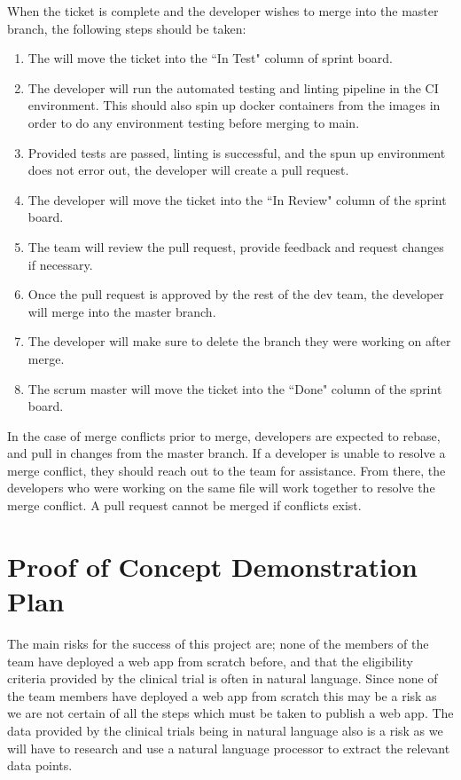 \documentclass{article}
\begin{document}
When the ticket is complete and the developer wishes to merge into the master branch, the following steps should be taken:
\begin{enumerate}
	\item The will move the ticket into the ``In Test" column of sprint board.
	\item The developer will run the automated testing and linting pipeline in the CI environment.
	This should also spin up docker containers from the images in order to do any environment testing before merging to main.
	\item Provided tests are passed, linting is successful, and the spun up environment does not error out, the developer will create a pull request.
	\item The developer will move the ticket into the ``In Review" column of the sprint board.
	\item The team will review the pull request, provide feedback and request changes if necessary. 
	\item Once the pull request is approved by the rest of the dev team, the developer will merge into the master branch.
	\item The developer will make sure to delete the branch they were working on after merge.
	\item The scrum master will move the ticket into the ``Done" column of the sprint board.
\end{enumerate}

In the case of merge conflicts prior to merge, developers are expected to rebase, and pull in changes from the master branch.
If a developer is unable to resolve a merge conflict, they should reach out to the team for assistance. 
From there, the developers who were working on the same file will work together to resolve the merge conflict. 
A pull request cannot be merged if conflicts exist.\\

\section{Proof of Concept Demonstration Plan}

The main risks for the success of this project are; none of the members of the team have deployed a web app from scratch before, and that the eligibility criteria provided by the clinical trial is often in natural language. Since none of the team members have deployed a web app from scratch this may be a risk as we are not certain of all the steps which must be taken to publish a web app. The data provided by the clinical trials being in natural language also is a risk as we will have to research and use a natural language processor to extract the relevant data points. 
\end{document}
